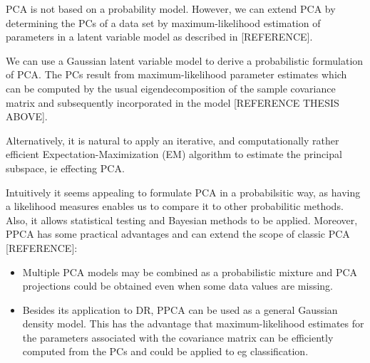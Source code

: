 \documentclass[journal, a4paper]{IEEEtran}
\begin{document}
PCA is not based on a probability model. However, we can extend PCA by determining the PCs of a data set by maximum-likelihood estimation of parameters in a latent variable model as described in [REFERENCE].

We can use a Gaussian latent variable model %
to derive a probabilistic formulation of PCA. The PCs result from maximum-likelihood parameter estimates which can be computed by the usual eigendecomposition of the sample covariance matrix and subsequently incorporated in the model [REFERENCE THESIS ABOVE]. 

Alternatively, it is natural to apply an iterative, and computationally rather efficient Expectation-Maximization (EM) algorithm to estimate the principal subspace, ie effecting PCA.


Intuitively it seems appealing to formulate PCA in a probabilsitic way, as having a likelihood measures enables us to compare it to other probabilitic methods. Also, it allows statistical testing and Bayesian methods to be applied. 
Moreover, PPCA has some practical advantages and can extend the scope of classic PCA [REFERENCE]:
\begin{itemize}
	\item  Multiple PCA models may be combined as a probabilistic mixture and PCA projections could be obtained even when some data values are missing.
	\item Besides its application to DR, PPCA can be used as a general Gaussian density model. This has the advantage that maximum-likelihood estimates for the parameters associated with the covariance matrix can be efficiently computed from the PCs and could be applied to eg classification. 
\end{itemize}


\hfill
\end{document}
